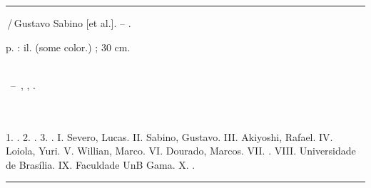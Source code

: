 \begin{fichacatalografica}
	\vspace*{\fill}					%
	\hrule							%
	\begin{center}					%
	\begin{minipage}[c]{12.5cm}		%

	\imprimirautorunico

	\hspace{0.5cm} \imprimirtitulo\,/\,Gustavo Sabino [et al.]. -- \imprimirdata.

	\hspace{0.5cm} \pageref{LastPage} p. : il. (some color.) ; 30 cm.\\

	\hspace{0.5cm} \imprimirorientadorRotulo~\imprimirorientador\\

	\hspace{0.5cm}
	\parbox[t]{\textwidth}{\imprimirtipotrabalho~--~\imprimirinstituicao, \imprimirlocal, \imprimirdata.}\\\\

	\hspace{0.5cm}
		1. \imprimirpalavrachaveum.
		2. \imprimirpalavrachavedois.
		3. \imprimirpalavrachavetres.
		I. Severo, Lucas.
		II. Sabino, Gustavo.
		III. Akiyoshi, Rafael.
                IV. Loiola, Yuri.
                V.  Willian, Marco.
                VI. Dourado, Marcos.
		VII. \imprimirorientador.
		VIII. Universidade de Brasília.
		IX. Faculdade UnB Gama.
		X. \imprimirtitulo.\\
	\end{minipage}
	\end{center}
	\hrule
\end{fichacatalografica}
\clearpage
